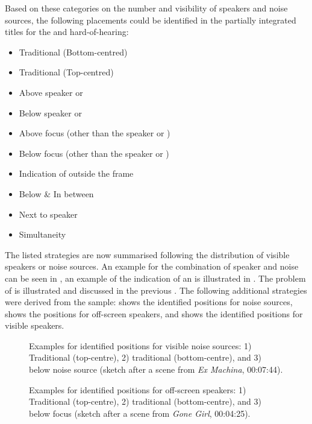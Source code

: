 Based on these categories on the number and visibility of speakers and noise sources, the following placements could be identified in the partially integrated titles for the  and hard-of-hearing:

\begin{itemize}
\item Traditional (Bottom-centred)
\item Traditional (Top-centred)
\item Above speaker or 
\item Below speaker or 
\item Above focus (other than the speaker or )
\item Below focus (other than the speaker or )
\item Indication of  outside the frame
\item Below \& In between
\item Next to speaker
\item Simultaneity
\end{itemize}

The listed strategies are now summarised following the distribution of visible speakers or noise sources. An example for the combination of speaker and noise can be seen in , an example of the indication of an  is illustrated in . The problem of  is illustrated and discussed in the previous . The following additional strategies were derived from the sample:  shows the identified positions for noise sources,  shows the positions for off-screen speakers, and  shows the identified positions for visible speakers.

\begin{figure}[p]
\caption{Examples for identified positions for visible noise sources: 1) Traditional (top-centre), 2) traditional (bottom-centre), and 3) below noise source (sketch after a scene from \textit{Ex Machina}, 00:07:44).}
\label{fig:FIG22}
\end{figure}




\begin{figure}[p]
\caption{Examples for identified positions for off-screen speakers: 1) Traditional (top-centre), 2) traditional (bottom-centre), and 3) below focus (sketch after a scene from \textit{Gone Girl}, 00:04:25).}
\label{fig:FIG23}
\end{figure}

